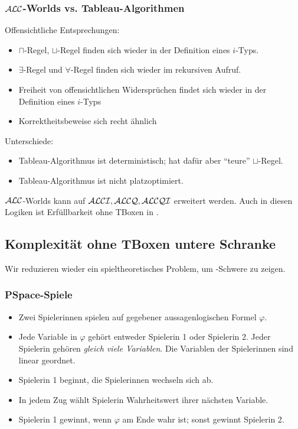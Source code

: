 \subsubsection{\texorpdfstring{$\mathcal{A}\mathcal{L}\mathcal{C}$}{ALC}-Worlds vs. Tableau-Algorithmen}
Offensichtliche Entsprechungen:
\begin{itemize}
  \item $\sqcap$-Regel, $\sqcup$-Regel finden sich wieder in der Definition eines $i$-Typs.
  \item $\exists$-Regel und $\forall$-Regel finden sich wieder im rekursiven Aufruf.
  \item Freiheit von offensichtlichen Widersprüchen findet sich wieder in der Definition eines $i$-Typs
  \item Korrektheitsbeweise sich recht ähnlich
\end{itemize}

Unterschiede:

\begin{itemize}
    \item Tableau-Algorithmus ist deterministisch; hat dafür aber \enquote{teure} $\sqcup$-Regel.
    \item Tableau-Algorithmus ist nicht platzoptimiert.
\end{itemize}

$\mathcal{A}\mathcal{L}\mathcal{C}$-Worlds kann auf $\mathcal{A}\mathcal{L}\mathcal{C}\mathcal{I}, \mathcal{A}\mathcal{L}\mathcal{C}\mathcal{Q}, \mathcal{A}\mathcal{L}\mathcal{C}\mathcal{Q}\mathcal{I}$ erweitert werden. Auch in diesen Logiken ist Erfüllbarkeit ohne TBoxen in \PSpace.

\subsection{Komplexität ohne TBoxen untere
Schranke}\label{komplexituxe4t-ohne-tboxen-untere-schranke}

Wir reduzieren wieder ein spieltheoretisches Problem, um \PSpace-Schwere zu zeigen.


\subsubsection{PSpace-Spiele}

\begin{itemize}
    \item Zwei Spielerinnen spielen auf gegebener aussagenlogischen Formel $\varphi$.
    \item Jede Variable in $\varphi$ gehört entweder Spielerin 1 oder Spielerin 2. Jeder Spielerin gehören \emph{gleich viele Variablen}. Die Variablen der Spielerinnen sind linear geordnet.
    \item Spielerin 1 beginnt, die Spielerinnen wechseln sich ab.

    \item In jedem Zug wählt Spielerin Wahrheitswert ihrer nächsten Variable.

    \item Spielerin 1 gewinnt, wenn $\varphi$ am Ende wahr ist; sonst gewinnt Spielerin 2.
\end{itemize}

